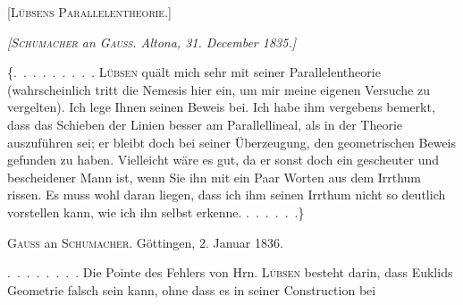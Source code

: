 \clearpage
{}%
\begin{center}
\Large\textsc{[Lübsens Parallelentheorie.]}
\end{center}


\begin{center}
\emph{[\textup{\textsc{Schumacher}} an \textup{\textsc{Gauss}}. Altona, 31. December 1835.]}
\end{center}

\{\mbox{.\ .\ .\ .\ .\ .\ .\ .\ .} \textsc{Lübsen} quält mich sehr mit seiner Parallelentheorie
(wahrscheinlich tritt die Nemesis hier ein, um mir meine eigenen
Versuche zu vergelten). Ich lege Ihnen seinen Beweis bei. Ich habe ihm
vergebens bemerkt, dass das Schieben der Linien besser am
Parallellineal, als in der Theorie auszuführen sei; er bleibt doch bei
seiner Überzeugung, den geometrischen Beweis gefunden zu haben.
Vielleicht wäre es gut, da er sonst doch ein gescheuter und
bescheidener Mann ist, wenn Sie ihn mit ein Paar Worten aus dem
Irrthum rissen. Es muss wohl daran liegen, dass ich ihm seinen
Irrthum nicht so deutlich vorstellen kann, wie ich ihn selbst
erkenne. \mbox{.\ .\ .\ .\ .\ .}\}


\begin{center}
\textsc{Gauss} an \textsc{Schumacher}. Göttingen, 2. Januar 1836.
\end{center}

\mbox{.\ .\ .\ .\ .\ .\ .\ .} Die Pointe des Fehlers von Hrn. \textsc{Lübsen} besteht darin,
dass Euklids Geometrie falsch sein kann, ohne dass es in seiner
Construction bei
